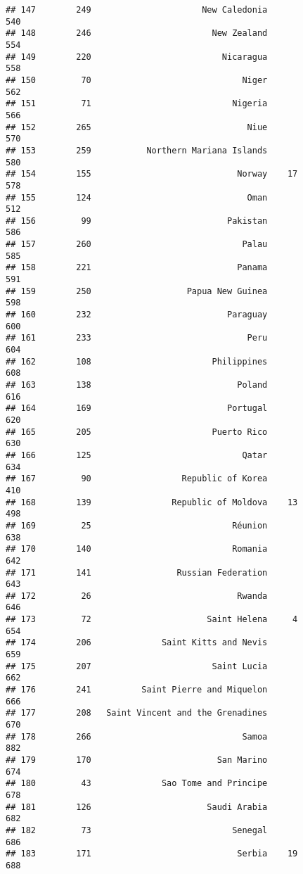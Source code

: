 \documentclass[]{article}
\begin{document}
\begin{verbatim}
## 147        249                      New Caledonia                540
## 148        246                        New Zealand                554
## 149        220                          Nicaragua                558
## 150         70                              Niger                562
## 151         71                            Nigeria                566
## 152        265                               Niue                570
## 153        259           Northern Mariana Islands                580
## 154        155                             Norway    17          578
## 155        124                               Oman                512
## 156         99                           Pakistan                586
## 157        260                              Palau                585
## 158        221                             Panama                591
## 159        250                   Papua New Guinea                598
## 160        232                           Paraguay                600
## 161        233                               Peru                604
## 162        108                        Philippines                608
## 163        138                             Poland                616
## 164        169                           Portugal                620
## 165        205                        Puerto Rico                630
## 166        125                              Qatar                634
## 167         90                  Republic of Korea                410
## 168        139                Republic of Moldova    13          498
## 169         25                            Réunion                638
## 170        140                            Romania                642
## 171        141                 Russian Federation                643
## 172         26                             Rwanda                646
## 173         72                       Saint Helena     4          654
## 174        206              Saint Kitts and Nevis                659
## 175        207                        Saint Lucia                662
## 176        241          Saint Pierre and Miquelon                666
## 177        208   Saint Vincent and the Grenadines                670
## 178        266                              Samoa                882
## 179        170                         San Marino                674
## 180         43              Sao Tome and Principe                678
## 181        126                       Saudi Arabia                682
## 182         73                            Senegal                686
## 183        171                             Serbia    19          688

\end{verbatim}
\end{document}
